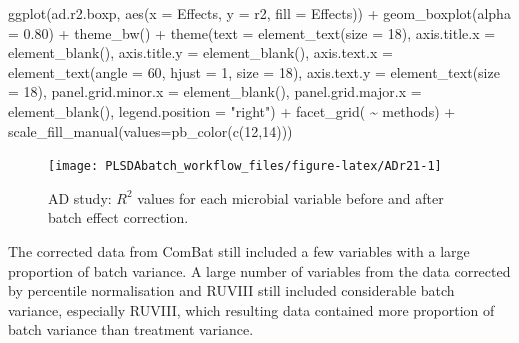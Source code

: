 \documentclass[
]{book}
\newenvironment{Shaded}{\begin{snugshade}}{\end{snugshade}}
\newcommand{\AttributeTok}[1]{\textcolor[rgb]{0.77,0.63,0.00}{#1}}
\newcommand{\DecValTok}[1]{\textcolor[rgb]{0.00,0.00,0.81}{#1}}
\newcommand{\FloatTok}[1]{\textcolor[rgb]{0.00,0.00,0.81}{#1}}
\newcommand{\FunctionTok}[1]{\textcolor[rgb]{0.00,0.00,0.00}{#1}}
\newcommand{\NormalTok}[1]{#1}
\newcommand{\SpecialCharTok}[1]{\textcolor[rgb]{0.00,0.00,0.00}{#1}}
\newcommand{\StringTok}[1]{\textcolor[rgb]{0.31,0.60,0.02}{#1}}
\begin{document}
\begin{Shaded}
\begin{Highlighting}[]
\FunctionTok{ggplot}\NormalTok{(ad.r2.boxp, }\FunctionTok{aes}\NormalTok{(}\AttributeTok{x =}\NormalTok{ Effects, }\AttributeTok{y =}\NormalTok{ r2, }\AttributeTok{fill =}\NormalTok{ Effects)) }\SpecialCharTok{+}
  \FunctionTok{geom\_boxplot}\NormalTok{(}\AttributeTok{alpha =} \FloatTok{0.80}\NormalTok{) }\SpecialCharTok{+}
  \FunctionTok{theme\_bw}\NormalTok{() }\SpecialCharTok{+} 
  \FunctionTok{theme}\NormalTok{(}\AttributeTok{text =} \FunctionTok{element\_text}\NormalTok{(}\AttributeTok{size =} \DecValTok{18}\NormalTok{),}
        \AttributeTok{axis.title.x =} \FunctionTok{element\_blank}\NormalTok{(),}
        \AttributeTok{axis.title.y =} \FunctionTok{element\_blank}\NormalTok{(),}
        \AttributeTok{axis.text.x =} \FunctionTok{element\_text}\NormalTok{(}\AttributeTok{angle =} \DecValTok{60}\NormalTok{, }\AttributeTok{hjust =} \DecValTok{1}\NormalTok{, }\AttributeTok{size =} \DecValTok{18}\NormalTok{),}
        \AttributeTok{axis.text.y =} \FunctionTok{element\_text}\NormalTok{(}\AttributeTok{size =} \DecValTok{18}\NormalTok{),}
        \AttributeTok{panel.grid.minor.x =} \FunctionTok{element\_blank}\NormalTok{(),}
        \AttributeTok{panel.grid.major.x =} \FunctionTok{element\_blank}\NormalTok{(),}
        \AttributeTok{legend.position =} \StringTok{"right"}\NormalTok{) }\SpecialCharTok{+} \FunctionTok{facet\_grid}\NormalTok{( }\SpecialCharTok{\textasciitilde{}}\NormalTok{ methods) }\SpecialCharTok{+} 
  \FunctionTok{scale\_fill\_manual}\NormalTok{(}\AttributeTok{values=}\FunctionTok{pb\_color}\NormalTok{(}\FunctionTok{c}\NormalTok{(}\DecValTok{12}\NormalTok{,}\DecValTok{14}\NormalTok{))) }
\end{Highlighting}
\end{Shaded}

\begin{figure}

{\centering \texttt{[image: PLSDAbatch\_workflow\_files/figure-latex/ADr21-1]} 

}

\caption{AD study: $R^2$ values for each microbial variable before and after batch effect correction.}\label{fig:ADr21}
\end{figure}

The corrected data from ComBat still included a few variables with a large proportion of batch variance. A large number of variables from the data corrected by percentile normalisation and RUVIII still included considerable batch variance, especially RUVIII, which resulting data contained more proportion of batch variance than treatment variance.
\end{document}
